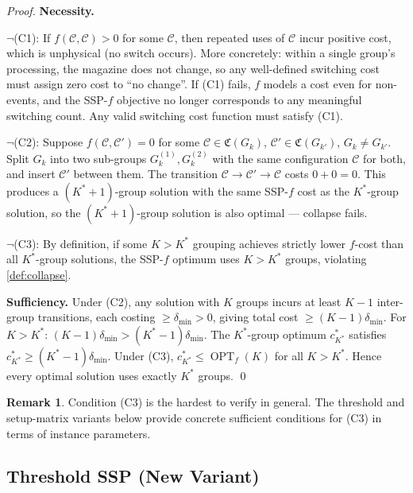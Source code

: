 \documentclass[11pt,a4paper]{article}
\theoremstyle{plain}
\theoremstyle{definition}
\newtheorem{remark}[theorem]{Remark}
\DeclareMathOperator{\OPT}{OPT}
\newcommand{\Cconf}{\mathfrak{C}}
\newcommand{\Kstar}{K^{*}}
\begin{document}
\begin{proofbox}
\begin{proof}
\textbf{Necessity.}

$\lnot$(C1): If $f(\mathcal{C},\mathcal{C})>0$ for some $\mathcal{C}$, then
repeated uses of $\mathcal{C}$ incur positive cost, which is unphysical (no switch
occurs). More concretely: within a single group's processing, the magazine does not
change, so any well-defined switching cost must assign zero cost to
``no change''. If (C1) fails, $f$ models a cost even for non-events, and the
SSP-$f$ objective no longer corresponds to any meaningful switching count.
Any valid switching cost function must satisfy (C1).

$\lnot$(C2): Suppose $f(\mathcal{C},\mathcal{C}')=0$ for some
$\mathcal{C}\in\Cconf(G_k)$, $\mathcal{C}'\in\Cconf(G_{k'})$, $G_k\ne G_{k'}$.
Split $G_k$ into two sub-groups $G_k^{(1)},G_k^{(2)}$ with the same configuration
$\mathcal{C}$ for both, and insert $\mathcal{C}'$ between them.
The transition $\mathcal{C}\to\mathcal{C}'\to\mathcal{C}$ costs $0+0=0$.
This produces a $(\Kstar+1)$-group solution with the same SSP-$f$ cost as the
$\Kstar$-group solution, so the $(\Kstar+1)$-group solution is also optimal ---
collapse fails.

$\lnot$(C3): By definition, if some $K>\Kstar$ grouping achieves strictly lower
$f$-cost than all $\Kstar$-group solutions, the SSP-$f$ optimum uses $K>\Kstar$
groups, violating \cref{def:collapse}.

\textbf{Sufficiency.}
Under (C2), any solution with $K$ groups incurs at least $K-1$ inter-group transitions,
each costing $\ge\delta_{\min}>0$, giving total cost $\ge(K-1)\delta_{\min}$.
For $K>\Kstar$: $(K-1)\delta_{\min}>(\Kstar-1)\delta_{\min}$.
The $\Kstar$-group optimum $c^*_{\Kstar}$ satisfies $c^*_{\Kstar}\ge(\Kstar-1)\delta_{\min}$.
Under (C3), $c^*_{\Kstar}\le\OPT_f(K)$ for all $K>\Kstar$.
Hence every optimal solution uses exactly $\Kstar$ groups. \qed
\end{proof}
\end{proofbox}

\begin{remark}
Condition (C3) is the hardest to verify in general. The threshold and setup-matrix
variants below provide concrete sufficient conditions for (C3) in terms of instance
parameters.
\end{remark}

\subsection{Threshold SSP (New Variant)}
\label{sec:threshold}
\end{document}
